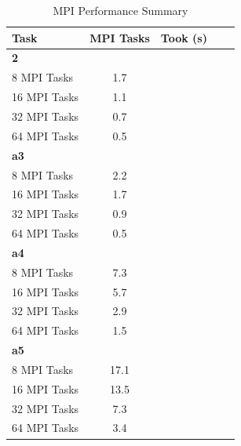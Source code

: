 \documentclass{article}
\begin{document}
\begin{table}[htbp]
  \centering
  \caption{MPI Performance Summary}
  \label{tab:mpi_performance}
  \begin{tabular}{lcccc}
    \toprule
    \textbf{Task} & \textbf{MPI Tasks} & \textbf{Took (s)} \\
    \midrule
    \textbf{2} & & \\
    8 MPI Tasks & 1.7 \\
    16 MPI Tasks & 1.1 \\
    32 MPI Tasks & 0.7 \\
    64 MPI Tasks & 0.5 \\
    \midrule
    \textbf{a3} & & \\
    8 MPI Tasks & 2.2 \\
    16 MPI Tasks & 1.7 \\
    32 MPI Tasks & 0.9 \\
    64 MPI Tasks & 0.5 \\
    \midrule
    \textbf{a4} & & \\
    8 MPI Tasks & 7.3 \\
    16 MPI Tasks & 5.7 \\
    32 MPI Tasks & 2.9 \\
    64 MPI Tasks & 1.5 \\
    \midrule
    \textbf{a5} & & \\
    8 MPI Tasks & 17.1 \\
    16 MPI Tasks & 13.5 \\
    32 MPI Tasks & 7.3 \\
    64 MPI Tasks & 3.4 \\
    \bottomrule
  \end{tabular}
\end{table}
\end{document}
